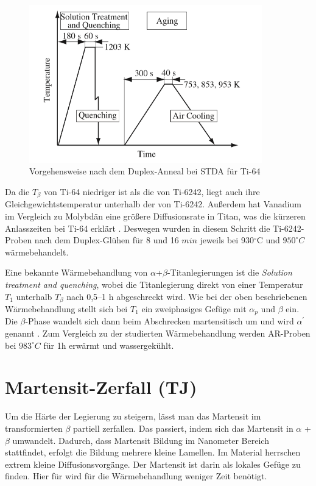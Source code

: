 \begin{figure}[H]
	\centering
	\includegraphics[width=0.9\textwidth]{Bilder/ts-stda}
	\caption{Vorgehensweise nach dem Duplex-Anneal bei STDA für Ti-64 \cite{Morita.2005}}
	\label{STDA}
\end{figure}

Da die $T_{\beta}$ von Ti-64 niedriger ist als die von Ti-6242, liegt auch ihre Gleichgewichtstemperatur unterhalb der von Ti-6242. Außerdem hat Vanadium im Vergleich zu Molybdän eine größere Diffusionsrate in Titan, was die kürzeren Anlasszeiten bei Ti-64 erklärt \cite{Zwicker.2014}. Deswegen wurden in diesem Schritt die Ti-6242-Proben nach dem Duplex-Glühen für 8 und 16 $min$ jeweils bei 930$^\circ$C und $950^\circ C$ wärmebehandelt.

Eine bekannte Wärmebehandlung von $\alpha$+$\beta$-Titanlegierungen ist die  \textit{Solution treatment and quenching}, wobei die Titanlegierung direkt von einer Temperatur $T_{1}$ unterhalb $T_{\beta}$ nach 0,5--1 h abgeschreckt wird. Wie bei der oben beschriebenen Wärmebehandlung stellt sich bei $T_{1}$ ein zweiphasiges Gefüge mit $\alpha_p$ und $\beta$ ein. Die $\beta$-Phase wandelt sich  dann beim Abschrecken martensitisch um und wird $\alpha^\prime$ genannt \cite{Morita.2005}. Zum Vergleich zu der studierten Wärmebehandlung werden AR-Proben bei $983^\circ C$ für 1h erwärmt und wassergekühlt.

\section{Martensit-Zerfall (TJ)}
Um die Härte der Legierung zu steigern, lässt man das Martensit im transformierten $\beta$ partiell zerfallen. Das passiert, indem sich das Martensit in $\alpha$ + $\beta$ umwandelt. Dadurch, dass Martensit Bildung im Nanometer Bereich stattfindet, erfolgt die Bildung mehrere kleine Lamellen. Im Material herrschen extrem kleine Diffusionsvorgänge. Der Martensit ist darin als lokales Gefüge zu finden. Hier für wird für die Wärmebehandlung weniger Zeit benötigt.


